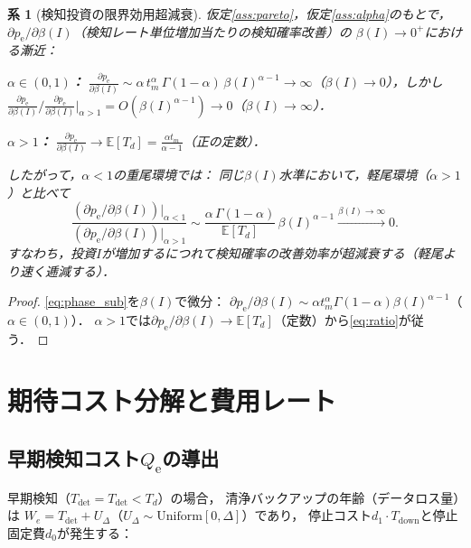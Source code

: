 \documentclass[12pt,a4paper]{article}
\theoremstyle{plain}
\newtheorem{corollary}[theorem]{系}
\theoremstyle{definition}
\theoremstyle{remark}
\newcommand{\E}{\mathbb{E}}
\newcommand{\pe}{p_{\mathrm{e}}}
\newcommand{\Qe}{Q_{\mathrm{e}}}
\newcommand{\Tdet}{T_{\mathrm{det}}}
\newcommand{\Tdown}{T_{\mathrm{down}}}
\newcommand{\betaI}{\beta(I)}
\begin{document}
\begin{corollary}[検知投資の限界効用超減衰]\label{cor:diminishing}
仮定\ref{ass:pareto}，仮定\ref{ass:alpha}のもとで，
$\partial\pe/\partial\betaI$（検知レート単位増加当たりの検知確率改善）の
$\betaI\to0^+$における漸近：

\noindent\textbf{$\alpha\in(0,1)$：}
$\frac{\partial\pe}{\partial\betaI}\sim\alpha\,t_m^\alpha\,\Gamma(1-\alpha)\,\betaI^{\alpha-1}
\to\infty$（$\betaI\to0$），しかし
$\frac{\partial\pe}{\partial\betaI}\Big/\frac{\partial\pe}{\partial\betaI}\Big|_{\alpha>1}
=O\!\left(\betaI^{\alpha-1}\right)\to0$（$\betaI\to\infty$）．

\noindent\textbf{$\alpha>1$：}
$\frac{\partial\pe}{\partial\betaI}\to\E[T_d]=\frac{\alpha t_m}{\alpha-1}$（正の定数）．

したがって，$\alpha<1$の重尾環境では：
同じ$\betaI$水準において，軽尾環境（$\alpha>1$）と比べて
\begin{equation}\label{eq:ratio}
  \frac{(\partial\pe/\partial\betaI)|_{\alpha<1}}{(\partial\pe/\partial\betaI)|_{\alpha>1}}
  \sim
  \frac{\alpha\,\Gamma(1-\alpha)}{\E[T_d]}\,\betaI^{\alpha-1}
  \xrightarrow{\betaI\to\infty} 0.
\end{equation}
すなわち，投資$I$が増加するにつれて検知確率の改善効率が\emph{超減衰}する（軽尾より速く逓減する）．
\end{corollary}

\begin{proof}
\eqref{eq:phase_sub}を$\betaI$で微分：
$\partial\pe/\partial\betaI \sim\alpha t_m^\alpha\Gamma(1-\alpha)\betaI^{\alpha-1}$（$\alpha\in(0,1)$）．
$\alpha>1$では$\partial\pe/\partial\betaI\to\E[T_d]$（定数）から\eqref{eq:ratio}が従う．
\end{proof}

\section{期待コスト分解と費用レート}
\label{sec:cost}

\subsection{早期検知コスト$\Qe$の導出}

早期検知（$\Tdet=T_{\mathrm{det}}<T_d$）の場合，
清浄バックアップの年齢（データロス量）は
$W_e=T_{\mathrm{det}}+U_\Delta$（$U_\Delta\sim\mathrm{Uniform}[0,\Delta]$）であり，
停止コスト$d_1\cdot\Tdown$と停止固定費$d_0$が発生する：
\end{document}
